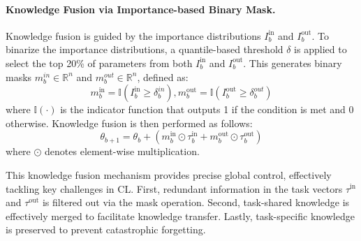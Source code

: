 
\paragraph{Knowledge Fusion via Importance-based Binary Mask.}
Knowledge fusion is guided by the importance distributions $I_b^{\text{in}}$ and $I_b^{\text{out}}$.
To binarize the importance distributions, a quantile-based threshold $\delta$ is applied to select the top 20\% of parameters from both $I_b^{\text{in}}$ and $I_b^{\text{out}}$. This generates binary masks $m_b^{in} \in \mathbb{R}^n$ and $m_b^{out} \in \mathbb{R}^n$, defined as:
\begin{equation}
m_b^{\text{in}} = \mathbb{I}(I_b^{\text{in}} \geq \delta_b^{in}), m_b^{\text{out}} = \mathbb{I}(I_b^{\text{out}} \geq \delta_b^{out}) \label{eq:mask}
\end{equation} 
where $\mathbb{I}(\cdot)$ is the indicator function that outputs 1 if the condition is met and 0 otherwise.
Knowledge fusion is then performed as follows:
\begin{equation}
\theta_{b+1} = \theta_b + (m_b^{\text{in}} \odot \tau_b^{\text{in}} + m_b^{\text{out}} \odot \tau_b^{\text{out}}) \label{eq:fusion}
\end{equation} 
where $\odot$ denotes element-wise multiplication.

This knowledge fusion mechanism provides precise global control, effectively tackling key challenges in CL.
First, redundant information in the task vectors $\tau^{\text{in}}$ and $\tau^{\text{out}}$ is filtered out via the mask operation. Second, task-shared knowledge is effectively merged to facilitate knowledge transfer. Lastly, task-specific knowledge is preserved to prevent catastrophic forgetting.

